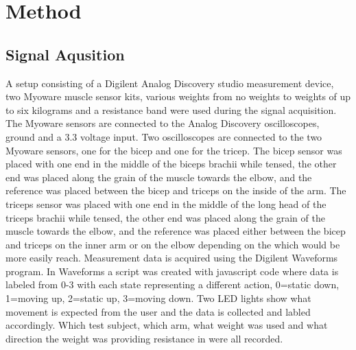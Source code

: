 \section{Method}
\label{section:method}



\subsection{Signal Aqusition}
A setup consisting of a Digilent Analog Discovery studio measurement device, two Myoware muscle sensor 
kits, various weights from no weights to weights of up to six kilograms and a resistance 
band were used during the signal acquisition. The Myoware sensors are connected to the Analog Discovery 
oscilloscopes, ground and a 3.3 voltage input. Two oscilloscopes are connected to the two Myoware 
sensors, one for the bicep and one for the tricep. The bicep sensor was placed with one end in the 
middle of the biceps brachii while tensed, the other end was placed along the grain of the muscle 
towards the elbow, and the reference was placed between the bicep and triceps on the inside 
of the arm. The triceps sensor was placed with one end in the middle of the long head of the triceps 
brachii while tensed, the other end was placed along the grain of the muscle towards the elbow, and 
the reference was placed either between the bicep and triceps on the inner arm or on the elbow depending on
the which would be more easily reach. Measurement data is acquired using the Digilent Waveforms program. 
In Waveforms a script was created with javascript code where data is labeled from 0-3 with each state 
representing a different action, 0=static down, 1=moving up, 2=static up, 3=moving down. Two LED lights show 
what movement is expected from the user and the data is collected and labled accordingly. Which test subject, 
which arm, what weight was used and what direction the weight was providing resistance in were all recorded.


